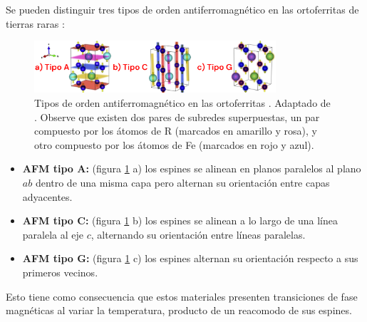 \documentclass[../main.tex]{subfiles}
\begin{document}
Se pueden distinguir tres tipos de orden antiferromagnético en las ortoferritas de tierras raras \cite{KamalWarshi2018}:
\begin{figure}[H]
    \centering
    \includegraphics[width=0.8\textwidth]{fig/tiposAFM.png}
    \caption{Tipos de orden antiferromagnético en las ortoferritas . Adaptado de \cite{Wang2019}. Observe que existen dos pares de subredes superpuestas, un par compuesto por los átomos de R (marcados en amarillo y rosa), y otro compuesto por los átomos de Fe (marcados en rojo y azul).}
    \label{fig:tiposAFM}
\end{figure}
\begin{itemize}
    \item \textbf{AFM tipo A:} (figura \ref{fig:tiposAFM} a) los espines se alinean en planos paralelos al plano $ab$ dentro de una misma capa pero alternan su orientación entre capas adyacentes.
    \item \textbf{AFM tipo C:} (figura \ref{fig:tiposAFM} b) los espines se alinean a lo largo de una línea paralela al eje $c$, alternando su orientación entre líneas paralelas.
    \item \textbf{AFM tipo G:} (figura \ref{fig:tiposAFM} c) los espines alternan su orientación respecto a sus primeros vecinos.
\end{itemize}
Esto tiene como consecuencia que estos materiales presenten transiciones de fase magnéticas al variar la temperatura, producto de un reacomodo de sus espines.
\end{document}
